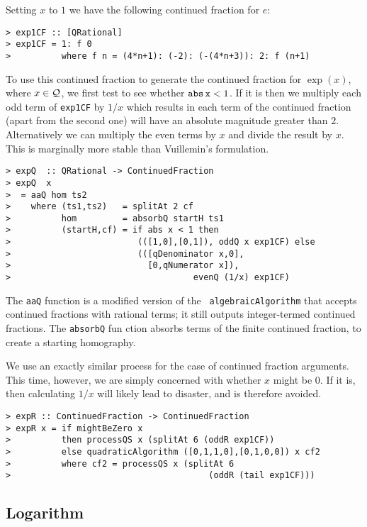 Setting $x$ to $1$ we have the following continued fraction for $e$:
\begin{verbatim}
> exp1CF :: [QRational]
> exp1CF = 1: f 0
>          where f n = (4*n+1): (-2): (-(4*n+3)): 2: f (n+1)
\end{verbatim}
%
%
To use this continued fraction to generate the continued fraction for
$\exp(x)$, where $x\in {\cal Q}$, we first test to see whether
$\mbox{\tt abs}\indexTT{abs}\,\mbox{\tt x}< 1$.  If it is then we multiply each
 odd term of \mbox{\tt exp1CF}
by $1/x$ which results in each term of the continued fraction (apart
from the second one) will have an absolute magnitude greater than $2$.
Alternatively we can multiply the even terms by $x$ and divide the
result by $x$. This is marginally more stable than Vuillemin's
formulation.
\begin{verbatim}
> expQ  :: QRational -> ContinuedFraction
> expQ  x
>  = aaQ hom ts2
>    where (ts1,ts2)   = splitAt 2 cf
>          hom         = absorbQ startH ts1
>          (startH,cf) = if abs x < 1 then
>                         (([1,0],[0,1]), oddQ x exp1CF) else
>                         (([qDenominator x,0],
>                           [0,qNumerator x]),
>                                    evenQ (1/x) exp1CF) 
\end{verbatim}
%
%
The \mbox{\tt aaQ} function is a modified version of the \mbox{\tt
 algebraicAlgorithm}
that accepts continued fractions with rational terms; it still outputs
integer-termed continued fractions. The \mbox{\tt absorbQ} fun
ction absorbs
terms of the finite continued fraction, to create a starting
homography.

We use an exactly similar process for the case of continued fraction
arguments. This time, however, we are simply concerned with whether
$x$ might be $0$. If it is, then calculating $1/x$ will likely lead to
disaster, and is therefore avoided.
\begin{verbatim}
> expR :: ContinuedFraction -> ContinuedFraction
> expR x = if mightBeZero x
>          then processQS x (splitAt 6 (oddR exp1CF))
>          else quadraticAlgorithm ([0,1,1,0],[0,1,0,0]) x cf2
>          where cf2 = processQS x (splitAt 6
>                                       (oddR (tail exp1CF)))
\end{verbatim}
%
%
\subsection{Logarithm}

